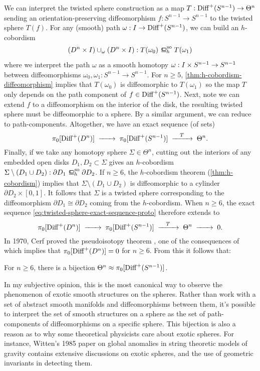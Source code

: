 	We can interpret the twisted sphere construction as a map $T: \Diff^+(S^{n-1})\to \Theta^n$ sending an orientation-preserving diffeomorphism $f : S^{n-1} \to S^{n-1}$ to the twisted sphere $T(f)$. For any (smooth) path $\omega : I \to \Diff^+(S^{n-1})$, we can build an $h$-cobordism 
	\[ (D^n\times I)\cup_\omega (D^n\times I) : T(\omega_0) \sohbord T(\omega_1)\]
	where we interpret the path $\omega$ as a smooth homotopy $\omega : I\times S^{n-1}\to\S^{n-1}$ between diffeomorphisms $\omega_0, \omega_1 : S^{n-1} \to S^{n-1}$. For $n\geq 5$, \cref{thm:h-cobordism-diffeomorphism} implies that $T(\omega_0)$ is diffeomorphic to $T(\omega_1)$ so the map $T$ only depends on the path component of $f\in \Diff^+(S^{n-1})$.
	Next, note we can extend $f$ to a diffeomorphism on the interior of the disk, the resulting twisted sphere must be diffeomorphic to a sphere. By a similar argument, we can reduce to path-components. Altogether, we have an exact sequence (of sets)
	\begin{equation}\label{eq:twisted-sphere-exact-sequence-proto}
		\pi_0 [\Diff^+(D^n)] \lkxto \pi_0 [\Diff^+(S^{n-1})] \lkxto[T] \Theta^n.
	\end{equation}
	Finally, if we take any homotopy sphere $\Sigma\in \Theta^n$, cutting out the interiors of any embedded open disks $D_1, D_2\subset \Sigma$ gives an $h$-cobordism $\Sigma\setminus(D_1\cup D_2) : \partial D_1 \sohbord \partial D_2$. If $n\geq 6$, the $h$-cobordism theorem (\ref{thm:h-cobordism}) implies that $\Sigma \setminus (D_1\cup D_2)$ is diffeomorphic to a cylinder $\partial D_2\times [0,1]$. It follows that $\Sigma$ is a twisted sphere corresponding to the diffeomorphism $\partial D_1 \cong \partial D_2$ coming from the $h$-cobordism.
	When $n\geq 6$, the exact sequence \cref{eq:twisted-sphere-exact-sequence-proto} therefore extends to 
	\[
		\pi_0 [\Diff^+(D^n)] \lkxto \pi_0 [\Diff^+(S^{n-1})] \lkxto[T] \Theta^n \lkxto 0.
	\]
	In 1970, Cerf proved the pseudoisotopy theorem \cite{cerf1970pseudoisotopy}, one of the consequences of which implies that $\pi_0[\Diff^+(D^n)]=0$ for $n\geq 6$. From this it follows that:

	\begin{proposition}
		For $n\geq 6$, there is a bijection $\Theta^n \cong \pi_0[\Diff^+(S^{n-1})]$.
	\end{proposition}

	In my subjective opinion, this is the most canonical way to observe the phenomenon of exotic smooth structures on the spheres. Rather than work with a set of abstract smooth manifolds and diffeomorphisms between them, it's possible to interpret the set of smooth structures on a sphere as the set of path-components of diffeomorphisms on a specific sphere. This bijection is also a reason as to why some theoretical physicists care about exotic spheres.  
	For instance, Witten's 1985 paper \cite{witten1985anomalies} on global anomalies in string theoretic models of gravity contains extensive discussions on exotic spheres, and the use of geometric invariants in detecting them.

